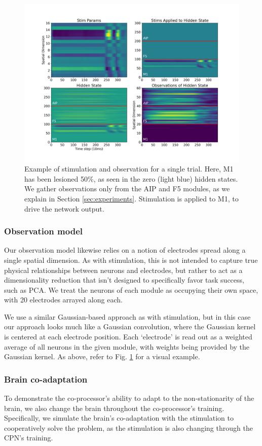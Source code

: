 \documentclass[12pt]{iopart}
\begin{document}
\begin{figure}[h]
	\centering
	\includegraphics[width=\textwidth]{stim_and_obs.png}
	\caption{Example of stimulation and observation for a single trial. Here, M1
	has been lesioned 50\%, as seen in the zero (light blue) hidden states. We
	gather observations only from the AIP and F5 modules, as we explain in
	Section \ref{sec:experiments}. Stimulation is applied to M1, to drive the
	network output.}
	\label{fig:stim_and_obs}
\end{figure}

\subsubsection{Observation model}
Our observation model likewise relies on a notion of electrodes spread along
a single spatial dimension. As with stimulation, this is not intended to
capture true physical relationships between neurons and electrodes, but
rather to act as a dimensionality reduction that isn't designed to specifically
favor task success, such as PCA. We treat the neurons of each module as
occupying their own space, with 20 electrodes arrayed along each.

We use a similar Gaussian-based approach as with stimulation, but in this
case our approach looks much like a Gaussian convolution, where the Gaussian
kernel is centered at each electrode position. Each `electrode' is read out
as a weighted average of all neurons in the given module, with weights being
provided by the Gaussian kernel. As above, refer to Fig. \ref{fig:stim_and_obs}
for a visual example.

\subsubsection{Brain co-adaptation}
To demonstrate the co-processor's ability to adapt to the non-stationarity
of the brain, we also change the brain throughout the co-processor's training.
Specifically, we simulate the brain's co-adaptation with the stimulation
to cooperatively solve the problem, as the stimulation is also changing
through the CPN's training.
\end{document}
